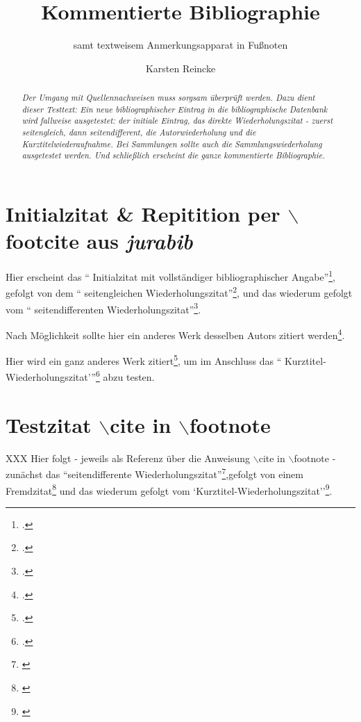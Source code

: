 \documentclass[DIV=calc,BCOR=5mm,11pt,headings=small,oneside,abstract=true, toc=bib]{scrartcl}
\begin{document}
\nocite{*}

\titlehead{Bibliographietest}
\subject{Zum Testen \itshape{neuer bibliographischer Angaben}}
\title{Kommentierte Bibliographie}
\subtitle{samt textweisem Anmerkungsapparat in Fußnoten}
\author{Karsten Reincke}
\maketitle

\begin{abstract}
\noindent \itshape
Der Umgang mit Quellennachweisen muss sorgsam überprüft werden. Dazu dient
dieser Testtext: Ein neue bibliographischer Eintrag in die bibliographische
Datenbank wird fallweise ausgetestet: der initiale Eintrag, das direkte
Wiederholungszitat - zuerst seitengleich, dann seitendifferent, die
Autorwiederholung und die Kurztitelwiederaufnahme. Bei Sammlungen sollte auch
die Sammlungswiederholung ausgetestet werden. Und schließlich erscheint die
ganze kommentierte Bibliographie.
\end{abstract}
\footnotesize
\normalsize

\section{Initialzitat \& Repitition per $\backslash$footcite aus \emph{jurabib}}

Hier erscheint das \enquote{ Initialzitat mit vollständiger bibliographischer
Angabe}\footcite[vgl. dazu:][123ff]{Covey2006a}, gefolgt von dem
\enquote{ seitengleichen Wiederholungszitat}\footcite[vgl.
dazu:][123ff]{Covey2006a}, und das wiederum gefolgt vom \enquote{ seitendifferenten
Wiederholungszitat}\footcite[vgl. dazu:][125f]{Covey2006a}.

Nach Möglichkeit sollte hier ein anderes Werk desselben Autors zitiert
werden\footcite[vgl. dazu:][321]{Covey2006a}.

Hier wird ein ganz anderes Werk zitiert\footcite[vgl.
dazu:][42]{KantKdU1974}, um im Anschluss das \enquote{
Kurztitel-Wiederholungszitat'}\footcite[vgl. dazu:][123]{Covey2006a}
abzu testen.

\section{Testzitat $\backslash$cite in $\backslash$footnote}

XXX Hier folgt - jeweils als Referenz über die Anweisung $\backslash$cite in
$\backslash$footnote - zunächst das ``seitendifferente
Wiederholungszitat''\footnote{\cite[vgl. dazu:][125]{Covey2006a}},gefolgt
von einem Fremdzitat\footnote{\cite[vgl. dazu:][42]{KantKdU1974}} und das
wiederum gefolgt vom `Kurztitel-Wiederholungszitat''\footnote{\cite[vgl.
dazu:][125]{Covey2006a}}.


\small

\end{document}
